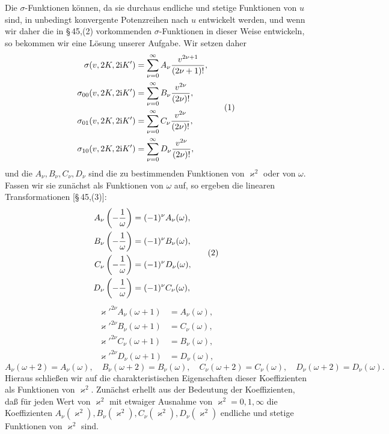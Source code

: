 \documentclass[11pt]{article}
\providecommand{\ii}{\mathrm{i}}
\begin{document}
Die $\sigma$-Funktionen können, da sie durchaus endliche und stetige Funktionen von $u$ sind, in unbedingt konvergente Potenzreihen nach $u$ entwickelt werden, und wenn wir daher die in \S\,45,(2) vorkommenden $\sigma$-Funktionen in dieser Weise entwickeln, so bekommen wir eine Lösung unserer Aufgabe. Wir setzen daher
\begin{equation}
\begin{aligned}
\sigma(v,2K,2\ii K')&=\sum_{\nu=0}^{\infty}A_\nu{v^{2\nu+1}\over(2\nu+1)!},\\
\sigma_{00}(v,2K,2\ii K')&=\sum_{\nu=0}^{\infty}B_\nu{v^{2\nu}\over(2\nu)!},\\
\sigma_{01}(v,2K,2\ii K')&=\sum_{\nu=0}^{\infty}C_\nu{v^{2\nu}\over(2\nu)!},\\
\sigma_{10}(v,2K,2\ii K')&=\sum_{\nu=0}^{\infty}D_\nu{v^{2\nu}\over(2\nu)!},
\end{aligned}
\tag{1}
\end{equation}
und die $A_\nu,B_\nu,C_\nu,D_\nu$ sind die zu bestimmenden Funktionen von $\varkappa^2$ oder von $\omega$. Fassen wir sie zunächst als Funktionen von $\omega$ auf, so ergeben die linearen Transformationen [\S\,45,(3)]:
\begin{equation}
\begin{aligned}
A_\nu\left(-{1\over\omega}\right)&=(-1)^\nu A_\nu(\omega),\\
B_\nu\left(-{1\over\omega}\right)&=(-1)^\nu B_\nu(\omega),\\
C_\nu\left(-{1\over\omega}\right)&=(-1)^\nu D_\nu(\omega),\\
D_\nu\left(-{1\over\omega}\right)&=(-1)^\nu C_\nu(\omega),
\end{aligned}
\tag{2}
\end{equation}
\begin{equation}
\begin{aligned}
\varkappa'^{2\nu}A_\nu(\omega+1)&=A_\nu(\omega),\\
\varkappa'^{2\nu}B_\nu(\omega+1)&=C_\nu(\omega),\\
\varkappa'^{2\nu}C_\nu(\omega+1)&=B_\nu(\omega),\\
\varkappa'^{2\nu}D_\nu(\omega+1)&=D_\nu(\omega),
\end{aligned}
\tag{3}
\end{equation}
\begin{equation}
A_\nu(\omega+2)=A_\nu(\omega),
\quad
B_\nu(\omega+2)=B_\nu(\omega),
\quad
C_\nu(\omega+2)=C_\nu(\omega),
\quad
D_\nu(\omega+2)=D_\nu(\omega).
\tag{4}
\end{equation}
Hieraus schließen wir auf die charakteristischen Eigenschaften dieser Koeffizienten als Funktionen von $\varkappa^2$. Zunächst erhellt aus der Bedeutung der Koeffizienten, daß für jeden Wert von $\varkappa^2$ mit etwaiger Ausnahme von $\varkappa^2=0,1,\infty$ die Koeffizienten $A_\nu(\varkappa^2),B_\nu(\varkappa^2),C_\nu(\varkappa^2),D_\nu(\varkappa^2)$ endliche und stetige Funktionen von $\varkappa^2$ sind.
\end{document}

